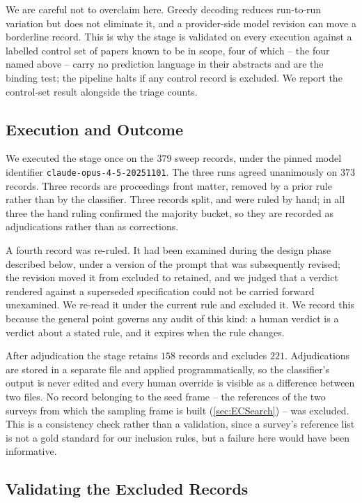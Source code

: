 We are careful not to overclaim here. Greedy decoding reduces run-to-run variation but does not
eliminate it, and a provider-side model revision can move a borderline record. This is why the stage
is validated on every execution against a labelled control set of papers known to be in scope,
four of which -- the four named above -- carry no prediction language in their abstracts and are the
binding test; the pipeline halts if any control record is excluded. We report the control-set result
alongside the triage counts.

\subsection{Execution and Outcome}

We executed the stage once on the \(379\) sweep records, under the pinned model identifier
\texttt{claude-opus-4-5-20251101}. The three runs agreed unanimously on \(373\) records. Three
records are proceedings front matter, removed by a prior rule rather than by the classifier. Three
records split, and were ruled by hand; in all three the hand ruling confirmed the majority bucket, so
they are recorded as adjudications rather than as corrections.

A fourth record was re-ruled. It had been examined during the design phase described below, under a
version of the prompt that was subsequently revised; the revision moved it from excluded to retained,
and we judged that a verdict rendered against a superseded specification could not be carried
forward unexamined. We re-read it under the current rule and excluded it. We record this because the
general point governs any audit of this kind: a human verdict is a verdict about a stated rule, and
it expires when the rule changes.

After adjudication the stage retains \(158\) records and excludes \(221\). Adjudications are stored
in a separate file and applied programmatically, so the classifier's output is never edited and every
human override is visible as a difference between two files. No record belonging to the seed frame --
the references of the two surveys from which the sampling frame is built (\cref{sec:ECSearch}) -- was
excluded. This is a consistency check rather than a validation, since a survey's reference list is
not a gold standard for our inclusion rules, but a failure here would have been informative.

\subsection{Validating the Excluded Records}

